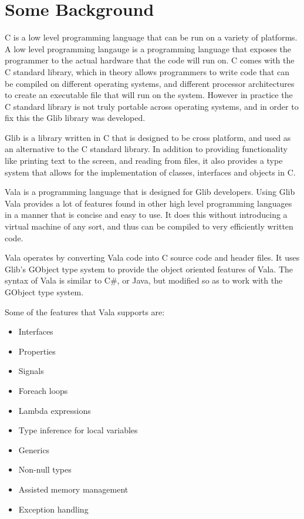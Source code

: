 \chapter{Some Background}

C is a low level programming language that can be run on a variety of platforms. A low level programming langauge is a programming language that exposes the programmer to the actual hardware that the code will run on. C comes with the C standard library, which in theory allows programmers to write code that can be compiled on different operating systems, and different processor architectures to create an executable file that will run on the system. However in practice the C standard library is not truly portable across operating systems, and in order to fix this the Glib library was developed.

Glib is a library written in C that is designed to be cross platform, and used as an alternative to the C standard library. In addition to providing functionality like printing text to the screen, and reading from files, it also provides a type system that allows for the implementation of classes, interfaces and objects in C.

Vala is a programming language that is designed for Glib developers. Using Glib Vala provides a lot of features found in other high level programming languages in a manner that is concise and easy to use. It does this without introducing a virtual machine of any sort, and thus can be compiled to very efficiently written code.

Vala operates by converting Vala code into C source code and header files. It uses Glib's GObject type system to provide the object oriented features of Vala. The syntax of Vala is similar to C\#, or Java, but modified so as to work with the GObject type system.

Some of the features that Vala supports are:

\begin{itemize}
	\item Interfaces
	\item Properties
	\item Signals
	\item Foreach loops
	\item Lambda expressions
	\item Type inference for local variables
	\item Generics
	\item Non-null types
	\item Assisted memory management
	\item Exception handling
\end{itemize}


